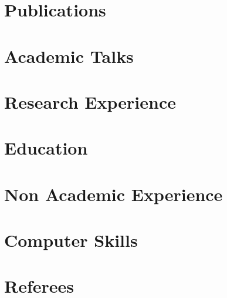 \documentclass[letter,10pt]{article}
\begin{document}


\section{Publications}


\section{Academic Talks}


\section{Research Experience}


\section{Education}


\section{Non Academic Experience}


\section{Computer Skills}


\section{Referees}

\end{document}
